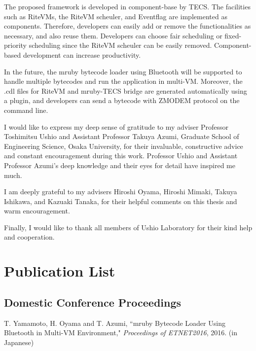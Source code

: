 \documentclass[a4j,12pt,oneside,openany,english]{jsbook}
\begin{document}
The proposed framework is developed in component-base by TECS.
The facilities such as RiteVMs, the RiteVM scheuler, and Eventflag are implemented as components.
Therefore, developers can easily add or remove the functionalities as necessary, and also reuse them.
Developers can choose fair scheduling or fixed-priority scheduling since the RiteVM scheuler can be easily removed.
Component-based development can increase productivity.

In the future, the mruby bytecode loader using Bluetooth will be supported to handle multiple bytecodes and run the application in multi-VM.
Moreover, the .cdl files for RiteVM and mruby-TECS bridge are generated automatically using a plugin, and developers can send a bytecode with ZMODEM protocol on the command line.

\begin{acknowledgement}
	I would like to express my deep sense of gratitude to my adviser Professor
	Toshimitsu Ushio and Assistant Professor Takuya Azumi, Graduate School of Engineering Science, Osaka University,
	for their invaluable, constructive advice and constant encouragement during this work.
	Professor Ushio and Assistant Professor Azumi's deep knowledge and their eyes for detail have inspired me much.

    I am deeply grateful to my advisers Hiroshi Oyama, Hiroshi Mimaki, Takuya Ishikawa, and Kazuaki Tanaka,
    for their helpful comments on this thesis and warm encouragement.

    Finally, I would like to thank all members of Ushio Laboratory for their kind help and cooperation.
\end{acknowledgement}




\chapter*{Publication List}
\section*{Domestic Conference Proceedings}
\begin{enumerate}[{[}1{]}]
\item
    T. Yamamoto, H. Oyama and T. Azumi,
    ``{mruby Bytecode Loader Using Bluetooth in Multi-VM Environment},"
    \emph{Proceedings of ETNET2016}, 2016.
    (in Japanese)
\end{enumerate}
\end{document}
